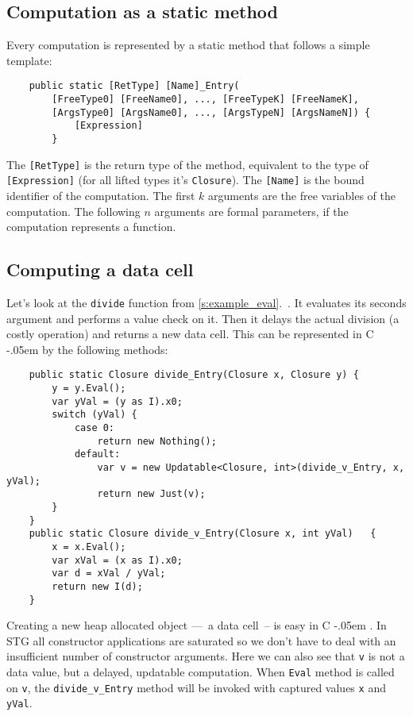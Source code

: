 \documentclass[en]{pracamgr}
\newcommand{\shrp}{%
  {\settoheight{\dimen0}{C}\kern-.05em \resizebox{!}{\dimen0}{\raisebox{\depth}{\textbf{\#}}}\hspace{1ex}}}
\newcommand{\myref}[1]{\ref{#1}.~\nameref{#1}}
\begin{document}
\subsection{Computation as a static method}

Every computation is represented by a static method that follows a simple template:

\begin{verbatim}
    public static [RetType] [Name]_Entry(
        [FreeType0] [FreeName0], ..., [FreeTypeK] [FreeNameK],
        [ArgsType0] [ArgsName0], ..., [ArgsTypeN] [ArgsNameN]) {
            [Expression]
        }
\end{verbatim}

The \verb|[RetType]| is the return type of the method,
equivalent to the type of \verb|[Expression]|
(for all lifted types it's \texttt{Closure}).
The \verb|[Name]| is the bound identifier of the computation.
The first $k$ arguments are the free variables of the computation.
The following $n$ arguments are formal parameters, if the computation represents a function.

\subsection{Computing a data cell}\label{s:compute_data}

Let's look at the \texttt{divide} function from \myref{s:example_eval}.
It evaluates its seconds argument and performs a value check on it.
Then it delays the actual division (a costly operation) and returns a new data cell.
This can be represented in C\shrp by the following methods:

\begin{verbatim}
    public static Closure divide_Entry(Closure x, Closure y) {
        y = y.Eval();
        var yVal = (y as I).x0;
        switch (yVal) {
            case 0:
                return new Nothing();
            default:
                var v = new Updatable<Closure, int>(divide_v_Entry, x, yVal);
                return new Just(v);
        }
    }
    public static Closure divide_v_Entry(Closure x, int yVal)   {
        x = x.Eval();
        var xVal = (x as I).x0;
        var d = xVal / yVal;
        return new I(d);
    }
\end{verbatim}

Creating a new heap allocated object ––~a data cell~--
is easy in C\shrp. In STG all constructor applications are
saturated so we don't have to deal with an
insufficient number of constructor arguments. Here we can
also see that \texttt{v} is not a data value, but a delayed,
updatable computation. When \texttt{Eval} method is called
on \texttt{v}, the \verb|divide_v_Entry| method will be
invoked with captured values \texttt{x} and \texttt{yVal}.
\end{document}
